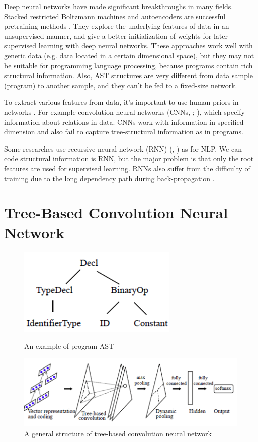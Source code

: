 \documentclass[11pt,technote]{IEEEtran}
\begin{document}
Deep neural networks have made significant breakthroughs in many fields.
Stacked restricted Boltzmann machines and autoencoders are successful pretraining methods \cite{fast,laywise}. They explore the underlying features of data in an unsupervised manner, and give
a better initialization of weights for later supervised learning with deep neural networks.
These approaches work well with generic data (e.g. data located in a certain dimensional space), but they may not be suitable for programming language processing, because programs contain rich structural information.
Also, AST structures are very different from  data sample (program) to another sample, and they can't be fed to
a fixed-size network.

To extract various features from data, it's important to use human priors in networks \cite{RL}.
For example convolution neural networks
(CNNs, \citeauthor{lenet} \citeyear{lenet}; \citeauthor{imagenet} \citeyear{imagenet}),
which specify information about relations in data.
CNNs work with information in specified dimension and also fail to capture tree-structural information as in programs.

Some researches use recursive neural network (RNN) \citeauthor{RNN} (\citeyear{RNN}, \citeyear{RAE}) as for NLP.
We can code structural information is RNN, but the major problem is that only the root features are used for supervised learning. RNNs also suffer from the difficulty of training due to the long dependency path
during back-propagation \cite{rnndifficult}.


\section{Tree-Based Convolution Neural Network}
\begin{figure}
\centering
\includegraphics[scale=0.6]{ast_example.png}
\caption{An example of program AST}
\label{AST_sample}
\includegraphics[scale=0.4]{tbcnn_struct.png}
\caption{A general structure of tree-based convolution neural network}
\label{tbcnn_struct}
\end{figure}
\end{document}
